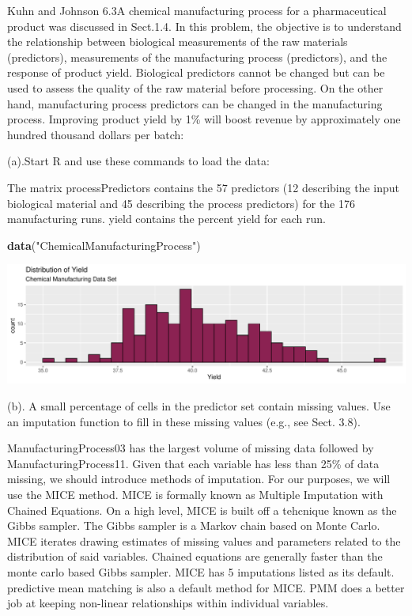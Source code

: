 \documentclass[]{report}
\newenvironment{Shaded}{\begin{snugshade}}{\end{snugshade}}
\newcommand{\KeywordTok}[1]{\textcolor[rgb]{0.13,0.29,0.53}{\textbf{#1}}}
\newcommand{\NormalTok}[1]{#1}
\newcommand{\StringTok}[1]{\textcolor[rgb]{0.31,0.60,0.02}{#1}}
\begin{document}
\begin{question}{Kuhn and Johnson 6.3}A chemical manufacturing process for a pharmaceutical product was discussed in Sect.1.4. In this problem, the objective is to understand the relationship between biological measurements of the raw materials (predictors), measurements of the manufacturing process (predictors), and the response of product yield. Biological predictors cannot be changed but can be used to assess the quality of the raw material before processing. On the other hand, manufacturing process predictors can be changed in the manufacturing process. Improving product yield by 1\% will boost revenue by approximately one hundred thousand dollars per batch:\end{question}

\begin{subquestion}{(a).}Start R and use these commands to load the data:
\end{subquestion}

The matrix processPredictors contains the 57 predictors (12 describing
the input biological material and 45 describing the process predictors)
for the 176 manufacturing runs. yield contains the percent yield for
each run.

\begin{Shaded}
\begin{Highlighting}[]
\KeywordTok{data}\NormalTok{(}\StringTok{"ChemicalManufacturingProcess"}\NormalTok{)}
\end{Highlighting}
\end{Shaded}

\includegraphics{Homework-Two_files/figure-latex/unnamed-chunk-2-1.pdf}

\begin{subquestion}{(b).} A small percentage of cells in the predictor set contain missing values. Use an imputation function to fill in these missing values (e.g., see Sect. 3.8). 
\end{subquestion}

ManufacturingProcess03 has the largest volume of missing data followed
by ManufacturingProcess11. Given that each variable has less than 25\%
of data missing, we should introduce methods of imputation. For our
purposes, we will use the MICE method. MICE is formally known as
Multiple Imputation with Chained Equations. On a high level, MICE is
built off a tehcnique known as the Gibbs sampler. The Gibbs sampler is a
Markov chain based on Monte Carlo. MICE iterates drawing estimates of
missing values and parameters related to the distribution of said
variables. Chained equations are generally faster than the monte carlo
based Gibbs sampler. MICE has 5 imputations listed as its default.
predictive mean matching is also a default method for MICE. PMM does a
better job at keeping non-linear relationships within individual
variables.
\end{document}
